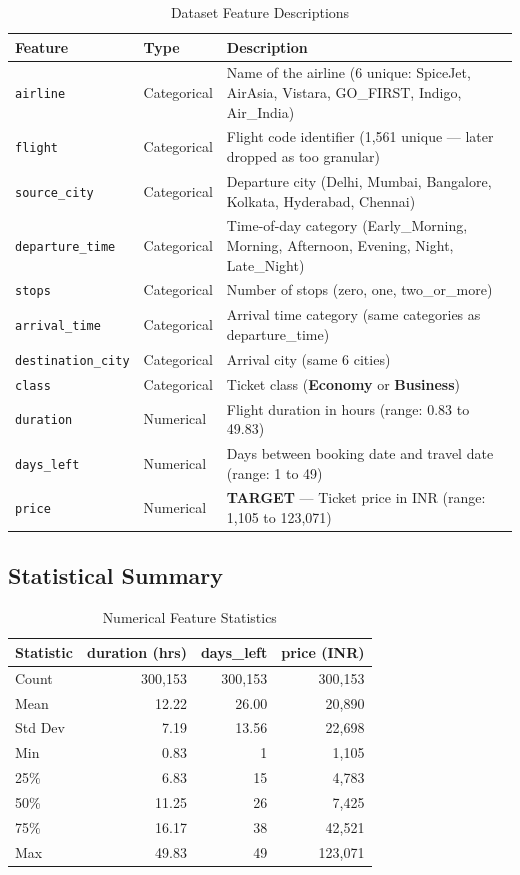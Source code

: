\documentclass[12pt, a4paper]{article}
\newcommand{\rupee}{\text{₹}}
\begin{document}
\begin{table}[H]
\centering
\caption{Dataset Feature Descriptions}
\begin{tabularx}{\textwidth}{l l X}
\toprule
\textbf{Feature} & \textbf{Type} & \textbf{Description} \\
\midrule
\texttt{airline} & Categorical & Name of the airline (6 unique: SpiceJet, AirAsia, Vistara, GO\_FIRST, Indigo, Air\_India) \\
\texttt{flight} & Categorical & Flight code identifier (1,561 unique — later dropped as too granular) \\
\texttt{source\_city} & Categorical & Departure city (Delhi, Mumbai, Bangalore, Kolkata, Hyderabad, Chennai) \\
\texttt{departure\_time} & Categorical & Time-of-day category (Early\_Morning, Morning, Afternoon, Evening, Night, Late\_Night) \\
\texttt{stops} & Categorical & Number of stops (zero, one, two\_or\_more) \\
\texttt{arrival\_time} & Categorical & Arrival time category (same categories as departure\_time) \\
\texttt{destination\_city} & Categorical & Arrival city (same 6 cities) \\
\texttt{class} & Categorical & Ticket class (\textbf{Economy} or \textbf{Business}) \\
\texttt{duration} & Numerical & Flight duration in hours (range: 0.83 to 49.83) \\
\texttt{days\_left} & Numerical & Days between booking date and travel date (range: 1 to 49) \\
\texttt{price} & Numerical & \textbf{TARGET} — Ticket price in INR (range: \rupee1,105 to \rupee123,071) \\
\bottomrule
\end{tabularx}
\end{table}

\subsection{Statistical Summary}

\begin{table}[H]
\centering
\caption{Numerical Feature Statistics}
\begin{tabular}{lrrr}
\toprule
\textbf{Statistic} & \textbf{duration (hrs)} & \textbf{days\_left} & \textbf{price (INR)} \\
\midrule
Count   & 300,153 & 300,153 & 300,153 \\
Mean    & 12.22   & 26.00   & 20,890 \\
Std Dev & 7.19    & 13.56   & 22,698 \\
Min     & 0.83    & 1       & 1,105 \\
25\%    & 6.83    & 15      & 4,783 \\
50\%    & 11.25   & 26      & 7,425 \\
75\%    & 16.17   & 38      & 42,521 \\
Max     & 49.83   & 49      & 123,071 \\
\bottomrule
\end{tabular}
\end{table}
\end{document}
